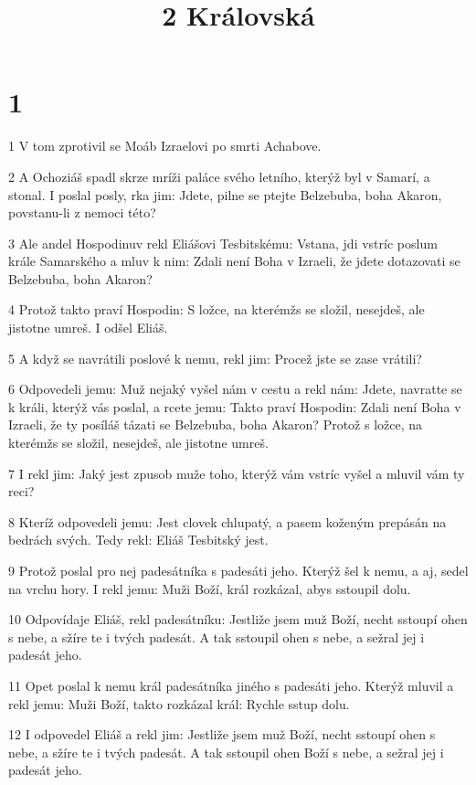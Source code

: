

\title{2 Královská}

\chapter{1}

\par 1 V tom zprotivil se Moáb Izraelovi po smrti Achabove.
\par 2 A Ochoziáš spadl skrze mríži paláce svého letního, kterýž byl v Samarí, a stonal. I poslal posly, rka jim: Jdete, pilne se ptejte Belzebuba, boha Akaron, povstanu-li z nemoci této?
\par 3 Ale andel Hospodinuv rekl Eliášovi Tesbitskému: Vstana, jdi vstríc poslum krále Samarského a mluv k nim: Zdali není Boha v Izraeli, že jdete dotazovati se Belzebuba, boha Akaron?
\par 4 Protož takto praví Hospodin: S ložce, na kterémžs se složil, nesejdeš, ale jistotne umreš. I odšel Eliáš.
\par 5 A když se navrátili poslové k nemu, rekl jim: Procež jste se zase vrátili?
\par 6 Odpovedeli jemu: Muž nejaký vyšel nám v cestu a rekl nám: Jdete, navratte se k králi, kterýž vás poslal, a rcete jemu: Takto praví Hospodin: Zdali není Boha v Izraeli, že ty posíláš tázati se Belzebuba, boha Akaron? Protož s ložce, na kterémžs se složil, nesejdeš, ale jistotne umreš.
\par 7 I rekl jim: Jaký jest zpusob muže toho, kterýž vám vstríc vyšel a mluvil vám ty reci?
\par 8 Kteríž odpovedeli jemu: Jest clovek chlupatý, a pasem koženým prepásán na bedrách svých. Tedy rekl: Eliáš Tesbitský jest.
\par 9 Protož poslal pro nej padesátníka s padesáti jeho. Kterýž šel k nemu, a aj, sedel na vrchu hory. I rekl jemu: Muži Boží, král rozkázal, abys sstoupil dolu.
\par 10 Odpovídaje Eliáš, rekl padesátníku: Jestliže jsem muž Boží, necht sstoupí ohen s nebe, a sžíre te i tvých padesát. A tak sstoupil ohen s nebe, a sežral jej i padesát jeho.
\par 11 Opet poslal k nemu král padesátníka jiného s padesáti jeho. Kterýž mluvil a rekl jemu: Muži Boží, takto rozkázal král: Rychle sstup dolu.
\par 12 I odpovedel Eliáš a rekl jim: Jestliže jsem muž Boží, necht sstoupí ohen s nebe, a sžíre te i tvých padesát. A tak sstoupil ohen Boží s nebe, a sežral jej i padesát jeho.
